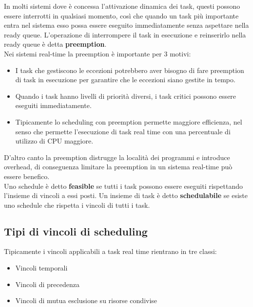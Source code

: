 \documentclass[12pt]{article}
\begin{document}
In molti sistemi dove è concessa l'attivazione dinamica dei task, questi possono essere interrotti in qualsiasi momento, così che quando un task più importante entra nel sistema esso possa essere eseguito immediatamente senza aspettare nella ready queue.
L'operazione di interrompere il task in esecuzione e reinserirlo nella ready queue è detta \textbf{preemption}.\\
Nei sistemi real-time la preemption è importante per 3 motivi:
\begin{itemize}
    \item I task che gestiscono le eccezioni potrebbero aver bisogno di fare preemption di task in esecuzione per garantire che le eccezioni siano gestite in tempo.
    \item Quando i task hanno livelli di priorità diversi, i task critici possono essere eseguiti immediatamente.
    \item Tipicamente lo scheduling con preemption permette maggiore efficienza, nel senso che permette l'esecuzione di task real time con una percentuale di utilizzo di CPU maggiore.
\end{itemize}
D'altro canto la preemption distrugge la località dei programmi e introduce overhead, di conseguenza limitare la preemption in un sistema real-time può essere benefico.
\\
Uno schedule è detto \textbf{feasible} se tutti i task possono essere eseguiti rispettando l'insieme di vincoli a essi posti.
Un insieme di task è detto \textbf{schedulabile} se esiste uno schedule che rispetta i vincoli di tutti i task.
\subsection{Tipi di vincoli di scheduling}
Tipicamente i vincoli applicabili a task real time rientrano in tre classi:
\begin{itemize}
    \item Vincoli temporali
    \item Vincoli di precedenza
    \item Vincoli di mutua esclusione su risorse condivise
\end{itemize}
\end{document}
